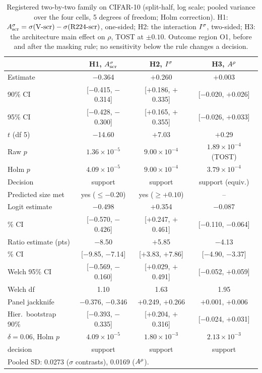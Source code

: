 \begin{table}[!t]
\centering
\caption{Registered two-by-two family on CIFAR-10 (split-half, log scale; pooled variance over the four cells, 5 degrees of freedom; Holm correction). H1: $A^{\sigma}_{\mathrm{scr}} = \sigma(\mbox{V-scr}) - \sigma(\mbox{R224-scr})$, one-sided; H2: the interaction $I^{\sigma}$, two-sided; H3: the architecture main effect on $\rho$, TOST at $\pm0.10$. Outcome region O1, before and after the masking rule; no sensitivity below the rule changes a decision.}
\label{tab:fb4}
\scriptsize
\setlength{\tabcolsep}{2pt}
\begin{tabular}{lccc}
\toprule
& \textbf{H1, $A^{\sigma}_{\mathrm{scr}}$} & \textbf{H2, $I^{\sigma}$} & \textbf{H3, $A^{\rho}$} \\
\midrule
Estimate & $-$0.364 & $+$0.260 & $+$0.003 \\
90\% CI & [$-$0.415, $-$0.314] & [$+$0.186, $+$0.335] & [$-$0.020, $+$0.026] \\
95\% CI & [$-$0.428, $-$0.300] & [$+$0.165, $+$0.355] & [$-$0.026, $+$0.033] \\
$t$ (df 5) & $-$14.60 & $+$7.03 & $+$0.29 \\
Raw $p$ & $1.36\times10^{-5}$ & $9.00\times10^{-4}$ & $1.89\times10^{-4}$ (TOST) \\
Holm $p$ & $4.09\times10^{-5}$ & $9.00\times10^{-4}$ & $3.79\times10^{-4}$ \\
Decision & support & support & support (equiv.) \\
Predicted size met & yes ($\leq -0.20$) & yes ($\geq +0.10$) & -- \\
\midrule
Logit estimate & $-$0.498 & $+$0.354 & $-$0.087 \\
\quad 90\% CI & [$-$0.570, $-$0.426] & [$+$0.247, $+$0.461] & [$-$0.110, $-$0.064] \\
Ratio estimate (pts) & $-$8.50 & $+$5.85 & $-$4.13 \\
\quad 90\% CI & [$-$9.85, $-$7.14] & [$+$3.83, $+$7.86] & [$-$4.90, $-$3.37] \\
Welch 95\% CI & [$-$0.569, $-$0.160] & [$+$0.029, $+$0.491] & [$-$0.052, $+$0.059] \\
\quad Welch df & 1.10 & 1.63 & 1.95 \\
Panel jackknife & $-$0.376, $-$0.346 & $+$0.249, $+$0.266 & $+$0.001, $+$0.006 \\
Hier.\ bootstrap 90\% & [$-$0.393, $-$0.335] & [$+$0.204, $+$0.316] & [$-$0.024, $+$0.031] \\
$\delta = 0.06$, Holm $p$ & $4.09\times10^{-5}$ & $1.80\times10^{-3}$ & $2.13\times10^{-3}$ \\
\quad decision & support & support & support \\
\bottomrule
\multicolumn{4}{l}{\scriptsize Pooled SD: 0.0273 ($\sigma$ contrasts), 0.0169 ($A^{\rho}$).}
\end{tabular}
\end{table}

